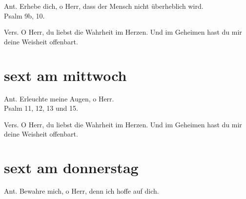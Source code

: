 
Ant. Erhebe dich, o Herr, dass der Mensch nicht überheblich wird.\\

Psalm 9b, 10.\\




Vers. O Herr, du liebst die Wahrheit im Herzen. Und im Geheimen hast du mir deine Weisheit offenbart.



\section[]{sext am mittwoch}



\def\greinitialformat#1{{\fontsize{40}{40}\selectfont #1}}
\gresetfirstlineaboveinitial{\small \textcolor{red}{ Ps 11 12 13 15 }}{}
\setaboveinitialseparation{0.72mm}


Ant. Erleuchte meine Augen, o Herr.\\

Psalm 11, 12, 13 und 15.\\


Vers. O Herr, du liebst die Wahrheit im Herzen. Und im Geheimen hast du mir deine Weisheit offenbart.

\section[]{sext am donnerstag}



\def\greinitialformat#1{{\fontsize{40}{40}\selectfont #1}}
\gresetfirstlineaboveinitial{\small \textcolor{red}{ Ps 16 17 18a }}{}
\setaboveinitialseparation{0.72mm}



Ant. Bewahre mich, o Herr, denn ich hoffe auf dich.\\

